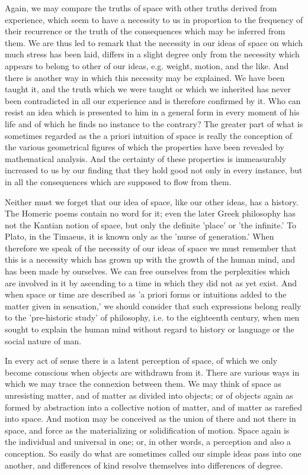 \documentclass[11pt,letter]{article}
\begin{document}
\par  Again, we may compare the truths of space with other truths derived from experience, which seem to have a necessity to us in proportion to the frequency of their recurrence or the truth of the consequences which may be inferred from them. We are thus led to remark that the necessity in our ideas of space on which much stress has been laid, differs in a slight degree only from the necessity which appears to belong to other of our ideas, e.g. weight, motion, and the like. And there is another way in which this necessity may be explained. We have been taught it, and the truth which we were taught or which we inherited has never been contradicted in all our experience and is therefore confirmed by it. Who can resist an idea which is presented to him in a general form in every moment of his life and of which he finds no instance to the contrary? The greater part of what is sometimes regarded as the a priori intuition of space is really the conception of the various geometrical figures of which the properties have been revealed by mathematical analysis. And the certainty of these properties is immeasurably increased to us by our finding that they hold good not only in every instance, but in all the consequences which are supposed to flow from them.

\par  Neither must we forget that our idea of space, like our other ideas, has a history. The Homeric poems contain no word for it; even the later Greek philosophy has not the Kantian notion of space, but only the definite 'place' or 'the infinite.' To Plato, in the Timaeus, it is known only as the 'nurse of generation.' When therefore we speak of the necessity of our ideas of space we must remember that this is a necessity which has grown up with the growth of the human mind, and has been made by ourselves. We can free ourselves from the perplexities which are involved in it by ascending to a time in which they did not as yet exist. And when space or time are described as 'a priori forms or intuitions added to the matter given in sensation,' we should consider that such expressions belong really to the 'pre-historic study' of philosophy, i.e. to the eighteenth century, when men sought to explain the human mind without regard to history or language or the social nature of man.

\par  In every act of sense there is a latent perception of space, of which we only become conscious when objects are withdrawn from it. There are various ways in which we may trace the connexion between them. We may think of space as unresisting matter, and of matter as divided into objects; or of objects again as formed by abstraction into a collective notion of matter, and of matter as rarefied into space. And motion may be conceived as the union of there and not there in space, and force as the materializing or solidification of motion. Space again is the individual and universal in one; or, in other words, a perception and also a conception. So easily do what are sometimes called our simple ideas pass into one another, and differences of kind resolve themselves into differences of degree.
\end{document}
